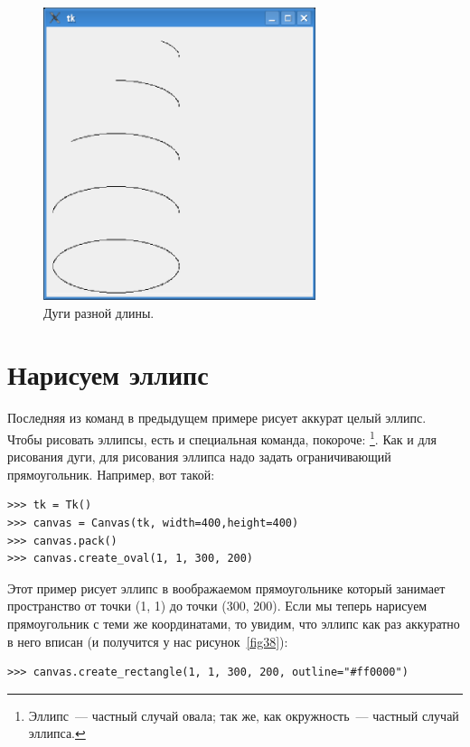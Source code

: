 \begin{figure}
\begin{center}
\includegraphics[width=80mm]{../en/figure37.eps}
\end{center}
\caption{Дуги разной длины.}\label{fig37}
\end{figure}

\section{Нарисуем эллипс}

Последняя из команд в предыдущем примере рисует аккурат целый эллипс. Чтобы рисовать эллипсы, есть и специальная команда, покороче: \footnote{Эллипс — частный случай овала; так же, как окружность — частный случай эллипса.}. Как и для рисования дуги, для рисования эллипса надо задать ограничивающий прямоугольник. Например, вот такой:

\begin{listing}
\begin{verbatim}
>>> tk = Tk()
>>> canvas = Canvas(tk, width=400,height=400)
>>> canvas.pack()
>>> canvas.create_oval(1, 1, 300, 200)
\end{verbatim}
\end{listing}

Этот пример рисует эллипс в воображаемом прямоугольнике который занимает пространство от точки (1, 1) до точки (300, 200). Если мы теперь нарисуем прямоугольник с теми же координатами, то увидим, что эллипс как раз аккуратно в него вписан (и получится у нас рисунок \ref{fig38}):

\begin{listing}
\begin{verbatim}
>>> canvas.create_rectangle(1, 1, 300, 200, outline="#ff0000")
\end{verbatim}
\end{listing}

